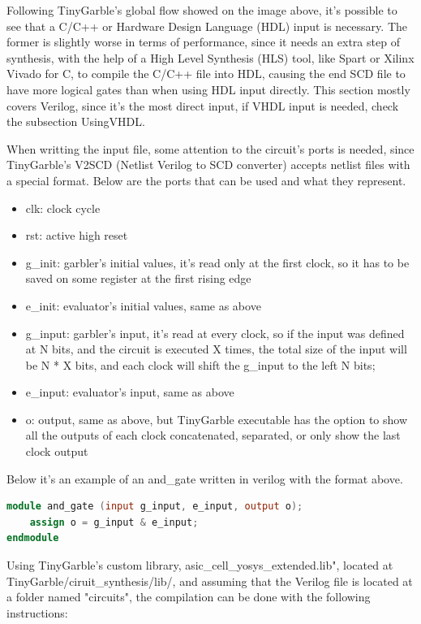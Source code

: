 \begin{refsection}
Following TinyGarble's global flow showed on the image above, it's possible to see that a C/C++ or Hardware Design Language (HDL) input is necessary. The former is slightly worse in terms of performance, since it needs an extra step of synthesis, with the help of a High Level Synthesis (HLS) tool, like Spart or Xilinx Vivado for C, to compile the C/C++ file into HDL, causing the end SCD file to have more logical gates than when using HDL input directly. This section mostly covers Verilog, since it's the most direct input, if VHDL input is needed, check the subsection UsingVHDL.

When writting the input file, some attention to the circuit's ports is needed, since TinyGarble's V2SCD (Netlist Verilog to SCD converter) accepts netlist files with a special format.
Below are the ports that can be used and what they represent.

\begin{itemize}
\item clk: clock cycle
\item rst: active high reset
\item g\_init: garbler's initial values, it's read only at the first clock, so it has to be saved on some register at the first rising edge
\item e\_init: evaluator's initial values, same as above
\item g\_input: garbler's input, it's read at every clock, so if the input was defined at N bits, and the circuit is executed X times, the total size of the input will be N * X bits, and each clock will shift the g\_input to the left N bits;
\item e\_input: evaluator's input, same as above
\item o: output, same as above, but TinyGarble executable has the option to show all the outputs of each clock concatenated, separated, or only show the last clock output
\end{itemize}

Below it's an example of an and\_gate written in verilog with the format above.

\begin{lstlisting}[caption={and\_gate.v}, language=Verilog, captionpos=b]
module and_gate (input g_input, e_input, output o);
	assign o = g_input & e_input;
endmodule
\end{lstlisting}

Using TinyGarble's custom library, asic\_cell\_yosys\_extended.lib", located at TinyGarble/ciruit\_synthesis/lib/, and assuming that the Verilog file is located at a folder named "circuits", the compilation can be done with the following instructions:


\end{refsection}
